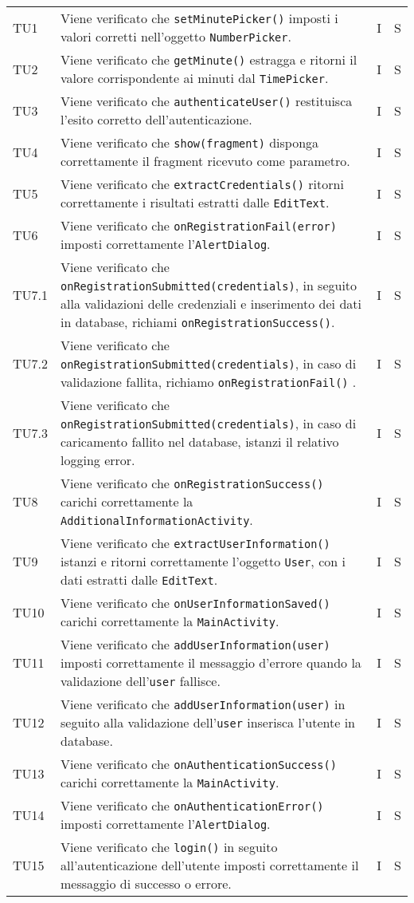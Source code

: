 \begin{longtable}{ >{\centering}p{}  >{\centering}p{} >{\centering}p{}
			>{\centering}p{}}
		TU1 & Viene verificato che \texttt{setMinutePicker()} imposti i valori corretti nell'oggetto \texttt{NumberPicker}. & I & S  \tabularnewline		
		TU2 & Viene verificato che \texttt{getMinute()} estragga e ritorni il valore corrispondente ai minuti dal \texttt{TimePicker}. & I & S \tabularnewline	
		TU3 & Viene verificato che \texttt{authenticateUser()} restituisca l'esito corretto dell'autenticazione. & I & S
		\tabularnewline	
		TU4 & Viene verificato che \texttt{show(fragment)} disponga correttamente il fragment ricevuto come parametro. & I & S
		\tabularnewline	
		TU5 & Viene verificato che \texttt{extractCredentials()} ritorni correttamente i risultati estratti dalle \texttt{EditText}. & I & S\tabularnewline	
		TU6 & Viene verificato che \texttt{onRegistrationFail(error)} imposti correttamente l'\texttt{AlertDialog}. & I & S
		\tabularnewline	
		TU7.1 & Viene verificato che \texttt{onRegistrationSubmitted(credentials)}, in seguito alla validazioni delle credenziali e inserimento dei dati in database, richiami \texttt{onRegistrationSuccess()}. & I & S
		\tabularnewline	
		TU7.2 & Viene verificato che \texttt{onRegistrationSubmitted(credentials)}, in caso di validazione fallita, richiamo \texttt{onRegistrationFail()} . & I & S
		\tabularnewline	
		TU7.3 & Viene verificato che \texttt{onRegistrationSubmitted(credentials)}, in caso di caricamento fallito nel database, istanzi il relativo logging error. & I & S
		\tabularnewline	
		TU8 & Viene verificato che \texttt{onRegistrationSuccess()} carichi correttamente la \texttt{AdditionalInformationActivity}. & I & S
		\tabularnewline	
		TU9 & Viene verificato che \texttt{extractUserInformation()} istanzi e ritorni correttamente l'oggetto \texttt{User}, con i dati estratti dalle \texttt{EditText}. & I & S
		\tabularnewline	
		TU10 & Viene verificato che \texttt{onUserInformationSaved()} carichi correttamente la \texttt{MainActivity}. & I & S
				\tabularnewline	
		TU11 & Viene verificato che \texttt{addUserInformation(user)} imposti correttamente il messaggio d'errore quando la validazione dell'\texttt{user} fallisce. & I & S
		\tabularnewline	
		TU12 & Viene verificato che \texttt{addUserInformation(user)} in seguito alla validazione dell'\texttt{user} inserisca l'utente in database. & I & S
		\tabularnewline	
		TU13 & Viene verificato che \texttt{onAuthenticationSuccess()} carichi correttamente la \texttt{MainActivity}. & I & S
		\tabularnewline	
		TU14 & Viene verificato che \texttt{onAuthenticationError()} imposti correttamente l'\texttt{AlertDialog}. & I & S
		\tabularnewline	
		TU15 & Viene verificato che \texttt{login()} in seguito all'autenticazione dell'utente imposti correttamente il messaggio di successo o errore. & I & S

\end{longtable}
